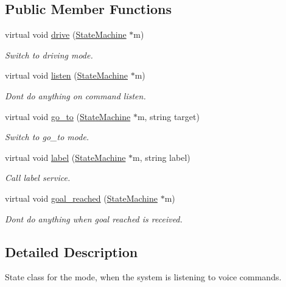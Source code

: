\subsection*{Public Member Functions}
\begin{DoxyCompactItemize}
\item 
virtual void \hyperlink{class_state___l_i_s_t_e_n_i_n_g_af77af4f01ff6fde1f64b133c5fa61cb8}{drive} (\hyperlink{class_state_machine}{State\+Machine} $\ast$m)
\begin{DoxyCompactList}\small\item\em Switch to driving mode. \end{DoxyCompactList}\item 
virtual void \hyperlink{class_state___l_i_s_t_e_n_i_n_g_a0063dbc4d0cc0712e4a69e67a452f92b}{listen} (\hyperlink{class_state_machine}{State\+Machine} $\ast$m)
\begin{DoxyCompactList}\small\item\em Don\textquotesingle{}t do anything on command listen. \end{DoxyCompactList}\item 
virtual void \hyperlink{class_state___l_i_s_t_e_n_i_n_g_ab6eba322cb293ec2b693f48260f72751}{go\+\_\+to} (\hyperlink{class_state_machine}{State\+Machine} $\ast$m, string target)
\begin{DoxyCompactList}\small\item\em Switch to go\+\_\+to mode. \end{DoxyCompactList}\item 
virtual void \hyperlink{class_state___l_i_s_t_e_n_i_n_g_a780b6f499710282279e60c7e48cd6611}{label} (\hyperlink{class_state_machine}{State\+Machine} $\ast$m, string label)
\begin{DoxyCompactList}\small\item\em Call label service. \end{DoxyCompactList}\item 
virtual void \hyperlink{class_state___l_i_s_t_e_n_i_n_g_a673b6c2cd73588f9db6b252c5e0d6d60}{goal\+\_\+reached} (\hyperlink{class_state_machine}{State\+Machine} $\ast$m)
\begin{DoxyCompactList}\small\item\em Don\textquotesingle{}t do anything when goal reached is received. \end{DoxyCompactList}\end{DoxyCompactItemize}


\subsection{Detailed Description}
State class for the mode, when the system is listening to voice commands. 

